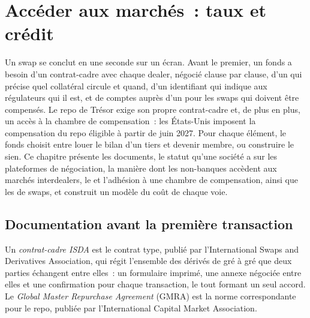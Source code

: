 \chapter{Accéder aux marchés~: taux et crédit}\label{ch:m2:getting-access-rates-credit}

Un swap se conclut en une seconde sur un écran. Avant le premier, un fonds a besoin d'un contrat-cadre
avec chaque dealer, négocié clause par clause, d'un  qui précise quel collatéral
circule et quand, d'un identifiant qui indique aux régulateurs qui il est, et de comptes auprès d'un
 pour les swaps qui doivent être compensés. Le repo de Trésor exige son propre
contrat-cadre et, de plus en plus, un accès à la chambre de compensation~: les États-Unis imposent
la compensation du repo éligible à partir de juin 2027. Pour chaque élément, le fonds choisit entre
louer le bilan d'un tiers et devenir membre, ou construire le sien. Ce chapitre présente les documents,
le statut qu'une société a sur les plateformes de négociation, la manière dont les non-banques accèdent
aux marchés interdealers, le  et l'adhésion à une chambre de compensation, ainsi que les
 de swaps, et construit un modèle du coût de chaque voie.

\section{Documentation avant la première transaction}

\begin{definition}\label{def:m2:getting-access-rates-credit:isda}
Un \emph{contrat-cadre ISDA} est le contrat type,
publié par l'International Swaps and Derivatives Association, qui régit l'ensemble des
dérivés de gré à gré que deux parties échangent entre elles~: un formulaire imprimé, une
annexe négociée entre elles et une confirmation pour chaque transaction, le tout formant
un seul accord. Le \emph{Global Master Repurchase Agreement}
(GMRA) est la norme correspondante pour le repo, publiée par
l'International Capital Market Association.
\end{definition}

